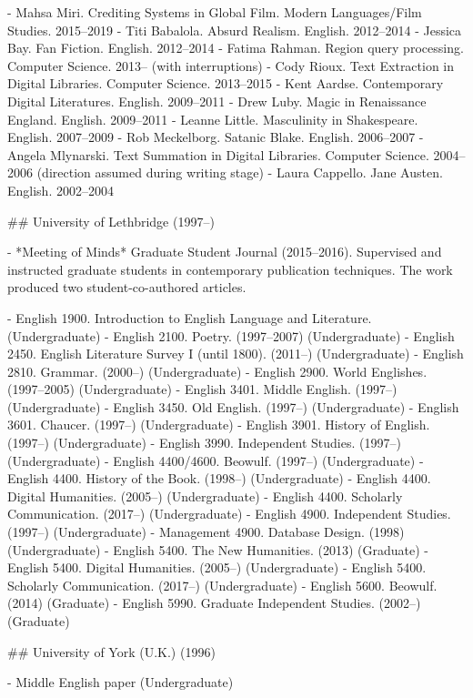 - Mahsa Miri. Crediting Systems in Global Film. Modern Languages/\allowbreak{}Film Studies. 2015–2019
- Titi Babalola. Absurd Realism. English. 2012–2014
- Jessica Bay. Fan Fiction. English. 2012–2014
- Fatima Rahman. Region query processing. Computer Science. 2013– (with interruptions)
- Cody Rioux. Text Extraction in Digital Libraries. Computer Science. 2013–2015
- Kent Aardse. Contemporary Digital Literatures. English. 2009–2011
- Drew Luby. Magic in Renaissance England. English. 2009–2011
- Leanne Little. Masculinity in Shakespeare. English. 2007–2009
- Rob Meckelborg. Satanic Blake. English. 2006–2007
- Angela Mlynarski. Text Summation in Digital Libraries. Computer Science. 2004–2006 (direction assumed during writing stage)
- Laura Cappello. Jane Austen. English. 2002–2004


\sectionbreak{}
## University of Lethbridge (1997–)

- *Meeting of Minds* Graduate Student Journal (2015–2016). Supervised and instructed graduate students in contemporary publication techniques. The work produced two student-co-authored articles.

- English 1900. Introduction to English Language and Literature. (Undergraduate)
- English 2100. Poetry. (1997–2007) (Undergraduate)
- English 2450. English Literature Survey I (until 1800). (2011–) (Undergraduate)
- English 2810. Grammar. (2000–) (Undergraduate)
- English 2900. World Englishes. (1997–2005) (Undergraduate)
- English 3401. Middle English. (1997–) (Undergraduate)
- English 3450. Old English. (1997–) (Undergraduate)
- English 3601. Chaucer. (1997–) (Undergraduate)
- English 3901. History of English. (1997–) (Undergraduate)
- English 3990. Independent Studies. (1997–) (Undergraduate)
- English 4400/\allowbreak{}4600. Beowulf. (1997–) (Undergraduate)
- English 4400. History of the Book. (1998–) (Undergraduate)
- English 4400. Digital Humanities. (2005–) (Undergraduate)
- English 4400. Scholarly Communication. (2017–) (Undergraduate)
- English 4900. Independent Studies. (1997–) (Undergraduate)
- Management 4900. Database Design. (1998) (Undergraduate)
- English 5400. The New Humanities. (2013) (Graduate)
- English 5400. Digital Humanities. (2005–) (Undergraduate)
- English 5400. Scholarly Communication. (2017–) (Undergraduate)
- English 5600. Beowulf. (2014) (Graduate)
- English 5990. Graduate Independent Studies. (2002–) (Graduate)

\sectionbreak{}
## University of York (U.K.) (1996)

- Middle English paper (Undergraduate)

